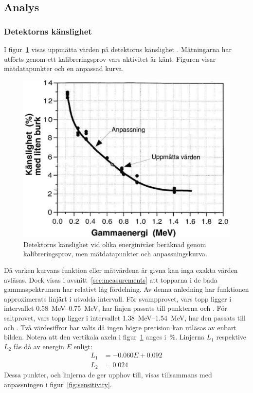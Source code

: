 \subsection{Analys} \label{sec:analysis}

\subsubsection{Detektorns känslighet} \label{sec:sensitivity}

I figur~\ref{fig:sensitivityraw} visas uppmätta värden på detektorns
känslighet \parencite{instructions}. Mätningarna har utförts genom ett
kalibreringsprov vars aktivitet är känt. Figuren visar mätdatapunkter
och en anpassad kurva.

\begin{figure}[!hp]
    \centering
    \includegraphics[width=\textwidth, keepaspectratio]{../images/sensitivity_raw.png}
    \caption{
        Detektorns känslighet vid olika energinivåer beräknad genom
        kalibreringsprov, men mätdatapunkter och anpassningskurva.
    }
    \label{fig:sensitivityraw}
\end{figure}

Då varken kurvans funktion eller mätvärdena är givna kan inga exakta värden
avläsas. Dock visas i avsnitt~\ref{sec:measurements} att topparna i de båda
gammaspektrumen har relativt låg fördelning. Av denna anledning har funktionen
approximerats linjärt i utvalda intervall. För svampprovet, vars topp ligger i
intervallet \qtyrange{0.58}{0.75}{\MeV}, har linjen passats till punkterna
 och . För saltprovet, vars topp ligger i
intervallet \qtyrange{1.38}{1.54}{\MeV}, har den passats till 
och . Två värdesiffror har valts då ingen högre precision kan
utläsas av enbart bilden. Notera att den vertikala axeln i
figur~\ref{fig:sensitivityraw} anges i~\unit{\percent}. Linjerna $L_1$
respektive $L_2$ fås då av energin $E$ enligt:
%
\begin{align}
    L_1 &= \num{-0.060} E + \num{0.092} \label{eq:line1} \\
    L_2 &= \num{0.024}                 \label{eq:line2}
\end{align}
%
Dessa punkter, och linjerna de ger upphov till, visas tillsammans med
anpassningen i figur~\ref{fig:sensitivity}.

